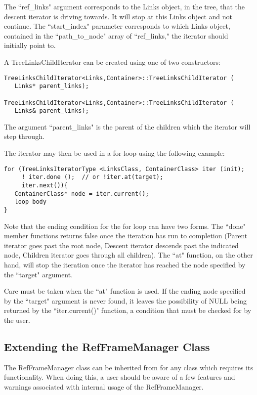 The ``ref\_links" argument corresponds to the Links object, in the tree, that
the descent iterator is driving towards. It will stop at this Links object
and not continue. The ``start\_index" parameter corresponds to which Links
object, contained in the ``path\_to\_node" array of ``ref\_links," the iterator should
initially point to.

A TreeLinksChildIterator can be created using one of two constructors:

\begin{verbatim}
TreeLinksChildIterator<Links,Container>::TreeLinksChildIterator (
   Links* parent_links);

TreeLinksChildIterator<Links,Container>::TreeLinksChildIterator (
   Links& parent_links);
\end{verbatim}

The argument ``parent\_links" is the parent of the children which the iterator
will step through.

The iterator may then be used in a for loop using the following
example:

\begin{verbatim}
for (TreeLinksIteratorType <LinksClass, ContainerClass> iter (init);
     ! iter.done ();  // or !iter.at(target);
     iter.next()){
   ContainerClass* node = iter.current();
   loop body
}
\end{verbatim}

Note that the ending condition for the for loop can have two forms. The
``done" member functions returns false once the iteration has run
to completion (Parent iterator goes past the root node, Descent iterator
descends past the indicated node, Children iterator goes through all children).
The ``at" function, on the other hand,
will stop the iteration once the iterator has reached
the node specified by the ``target" argument.

Care must be taken when the
``at" function is used. If the ending node specified by the ``target" argument
is never found, it leaves the possibility of NULL being returned by
the ``iter.current()" function, a condition that must be checked for
by the user.

\subsection{Extending the RefFrameManager Class}

The RefFrameManager class can be inherited from for any class which requires
its functionality. When doing this, a user should be aware of a few features and
warnings associated with internal usage of the RefFrameManager.


